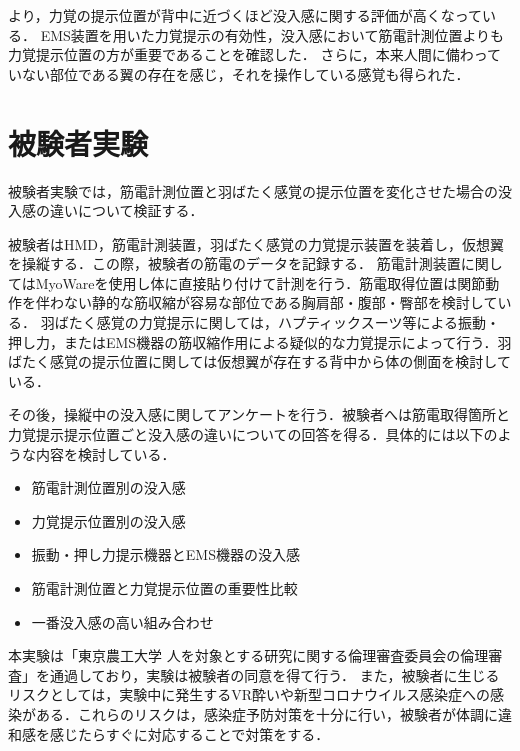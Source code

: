  
        より，力覚の提示位置が背中に近づくほど没入感に関する評価が高くなっている．
        EMS装置を用いた力覚提示の有効性，没入感において筋電計測位置よりも力覚提示位置の方が重要であることを確認した．
        さらに，本来人間に備わっていない部位である翼の存在を感じ，それを操作している感覚も得られた．

\section{被験者実験}

  被験者実験では，筋電計測位置と羽ばたく感覚の提示位置を変化させた場合の没入感の違いについて検証する．
    
  被験者はHMD，筋電計測装置，羽ばたく感覚の力覚提示装置を装着し，仮想翼を操縦する．この際，被験者の筋電のデータを記録する．
  筋電計測装置に関してはMyoWareを使用し体に直接貼り付けて計測を行う．筋電取得位置は関節動作を伴わない静的な筋収縮が容易な部位である胸肩部・腹部・臀部を検討している．
  羽ばたく感覚の力覚提示に関しては，ハプティックスーツ等による振動・押し力，またはEMS機器の筋収縮作用による疑似的な力覚提示によって行う．羽ばたく感覚の提示位置に関しては仮想翼が存在する背中から体の側面を検討している．
  
  その後，操縦中の没入感に関してアンケートを行う．被験者へは筋電取得箇所と力覚提示提示位置ごと没入感の違いについての回答を得る．具体的には以下のような内容を検討している．
  \begin{itemize}
    \item 筋電計測位置別の没入感
    \item 力覚提示位置別の没入感
    \item 振動・押し力提示機器とEMS機器の没入感
    \item 筋電計測位置と力覚提示位置の重要性比較
    \item 一番没入感の高い組み合わせ
  \end{itemize}

  
  本実験は「東京農工大学 人を対象とする研究に関する倫理審査委員会の倫理審査」を通過しており，実験は被験者の同意を得て行う．
  また，被験者に生じるリスクとしては，実験中に発生するVR酔いや新型コロナウイルス感染症への感染がある．これらのリスクは，感染症予防対策を十分に行い，被験者が体調に違和感を感じたらすぐに対応することで対策をする．
  
